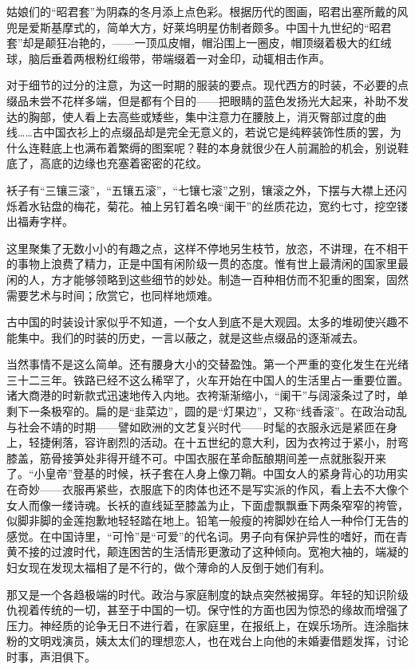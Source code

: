 \par 姑娘们的“昭君套”为阴森的冬月添上点色彩。根据历代的图画，昭君出塞所戴的风兜是爱斯基摩式的，简单大方，好莱坞明星仿制者颇多。中国十九世纪的“昭君套”却是颠狂冶艳的，——一顶瓜皮帽，帽沿围上一圈皮，帽顶缀着极大的红绒球，脑后垂着两根粉红缎带，带端缀着一对金印，动辄相击作声。
\par 对于细节的过分的注意，为这一时期的服装的要点。现代西方的时装，不必要的点缀品未尝不花样多端，但是都有个目的——把眼睛的蓝色发扬光大起来，补助不发达的胸部，使人看上去高些或矮些，集中注意力在腰肢上，消灭臀部过度的曲线……古中国衣衫上的点缀品却是完全无意义的，若说它是纯粹装饰性质的罢，为什么连鞋底上也满布着繁缛的图案呢？鞋的本身就很少在人前漏脸的机会，别说鞋底了，高底的边缘也充塞着密密的花纹。
\par 袄子有“三镶三滚”，“五镶五滚”，“七镶七滚”之别，镶滚之外，下摆与大襟上还闪烁着水钻盘的梅花，菊花。袖上另钉着名唤“阑干”的丝质花边，宽约七寸，挖空镂出福寿字样。
\par 这里聚集了无数小小的有趣之点，这样不停地另生枝节，放恣，不讲理，在不相干的事物上浪费了精力，正是中国有闲阶级一贯的态度。惟有世上最清闲的国家里最闲的人，方才能够领略到这些细节的妙处。制造一百种相仿而不犯重的图案，固然需要艺术与时间；欣赏它，也同样地烦难。
\par 古中国的时装设计家似乎不知道，一个女人到底不是大观园。太多的堆砌使兴趣不能集中。我们的时装的历史，一言以蔽之，就是这些点缀品的逐渐减去。
\par 当然事情不是这么简单。还有腰身大小的交替盈蚀。第一个严重的变化发生在光绪三十二三年。铁路已经不这么稀罕了，火车开始在中国人的生活里占一重要位置。诸大商港的时新款式迅速地传入内地。衣袴渐渐缩小，“阑干”与阔滚条过了时，单剩下一条极窄的。扁的是“韭菜边”，圆的是“灯果边”，又称“线香滚”。在政治动乱与社会不靖的时期——譬如欧洲的文艺复兴时代——时髦的衣服永远是紧匝在身上，轻捷俐落，容许剧烈的活动。在十五世纪的意大利，因为衣袴过于紧小，肘弯膝盖，筋骨接笋处非得开缝不可。中国衣服在革命酝酿期间差一点就胀裂开来了。“小皇帝”登基的时候，袄子套在人身上像刀鞘。中国女人的紧身背心的功用实在奇妙——衣服再紧些，衣服底下的肉体也还不是写实派的作风，看上去不大像个女人而像一缕诗魂。长袄的直线延至膝盖为止，下面虚飘飘垂下两条窄窄的袴管，似脚非脚的金莲抱歉地轻轻踏在地上。铅笔一般瘦的袴脚妙在给人一种伶仃无告的感觉。在中国诗里，“可怜”是“可爱”的代名词。男子向有保护异性的嗜好，而在青黄不接的过渡时代，颠连困苦的生活情形更激动了这种倾向。宽袍大袖的，端凝的妇女现在发现太福相了是不行的，做个薄命的人反倒于她们有利。
\par 那又是一个各趋极端的时代。政治与家庭制度的缺点突然被揭穿。年轻的知识阶级仇视着传统的一切，甚至于中国的一切。保守性的方面也因为惊恐的缘故而增强了压力。神经质的论争无日不进行着，在家庭里，在报纸上，在娱乐场所。连涂脂抹粉的文明戏演员，姨太太们的理想恋人，也在戏台上向他的未婚妻借题发挥，讨论时事，声泪俱下。
